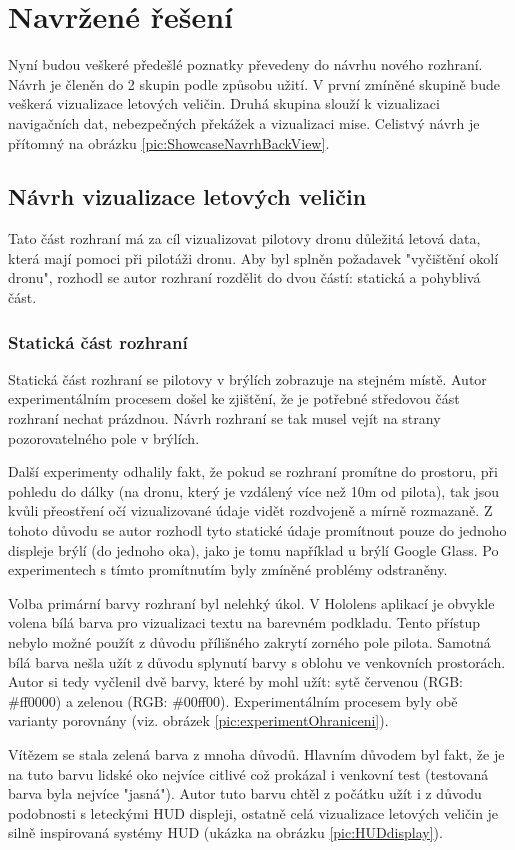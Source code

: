 \section{Navržené řešení}
Nyní budou veškeré předešlé poznatky převedeny do návrhu nového rozhraní. Návrh je členěn do 2 skupin podle způsobu užití. V první zmíněné skupině bude veškerá vizualizace letových veličin. Druhá skupina slouží k vizualizaci navigačních dat, nebezpečných překážek a vizualizaci mise. Celistvý návrh je přítomný na obrázku \ref{pic:ShowcaseNavrhBackView}.
\subsection{Návrh vizualizace letových veličin}
Tato část rozhraní má za cíl vizualizovat pilotovy dronu důležitá letová data, která mají pomoci při pilotáži dronu. Aby byl splněn požadavek "vyčištění okolí dronu", rozhodl se autor rozhraní rozdělit do dvou částí: statická a pohyblivá část. 
\subsubsection{Statická část rozhraní}
Statická část rozhraní se pilotovy v brýlích zobrazuje na stejném místě. Autor experimentálním procesem došel ke zjištění, že je potřebné středovou část rozhraní nechat prázdnou. Návrh rozhraní se tak musel vejít na strany pozorovatelného pole v brýlích. 

Další experimenty odhalily fakt, že pokud se rozhraní promítne do prostoru, při pohledu do dálky (na dronu, který je vzdálený více než 10m od pilota), tak jsou kvůli přeostření očí vizualizované údaje vidět rozdvojeně  a mírně rozmazaně. Z tohoto důvodu se autor rozhodl tyto statické údaje promítnout pouze do jednoho displeje brýlí  (do jednoho oka), jako je tomu například u brýlí Google Glass. Po experimentech s tímto promítnutím byly zmíněné problémy odstraněny. 

Volba primární barvy rozhraní byl nelehký úkol. V Hololens aplikací je obvykle volena bílá barva pro vizualizaci textu na barevném podkladu. Tento přístup nebylo možné použít z důvodu přílišného zakrytí zorného pole pilota. Samotná bílá barva nešla užít z důvodu splynutí barvy s oblohu ve venkovních prostorách. Autor si tedy vyčlenil dvě barvy, které by mohl užít: sytě červenou (RGB: \#ff0000) a zelenou (RGB: \#00ff00). Experimentálním procesem byly obě varianty porovnány (viz. obrázek \ref{pic:experimentOhraniceni}). 

Vítězem se stala zelená barva z mnoha důvodů. Hlavním důvodem byl fakt, že je na tuto barvu lidské oko nejvíce citlivé což prokázal i venkovní test (testovaná barva byla nejvíce "jasná"). Autor tuto barvu chtěl z počátku užít i z důvodu podobnosti s leteckými HUD displeji, ostatně  celá vizualizace letových veličin je silně inspirovaná systémy HUD (ukázka na obrázku \ref{pic:HUDdisplay}).   

